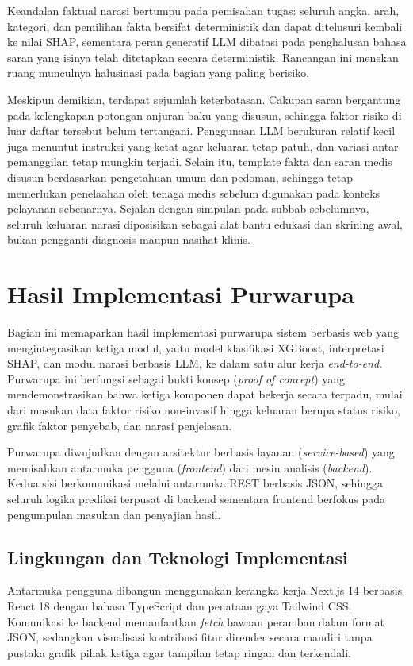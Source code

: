 Keandalan faktual narasi bertumpu pada pemisahan tugas: seluruh angka, arah, kategori, dan pemilihan fakta bersifat deterministik dan dapat ditelusuri kembali ke nilai SHAP, sementara peran generatif LLM dibatasi pada penghalusan bahasa saran yang isinya telah ditetapkan secara deterministik. Rancangan ini menekan ruang munculnya halusinasi pada bagian yang paling berisiko.

Meskipun demikian, terdapat sejumlah keterbatasan. Cakupan saran bergantung pada kelengkapan potongan anjuran baku yang disusun, sehingga faktor risiko di luar daftar tersebut belum tertangani. Penggunaan LLM berukuran relatif kecil juga menuntut instruksi yang ketat agar keluaran tetap patuh, dan variasi antar pemanggilan tetap mungkin terjadi. Selain itu, template fakta dan saran medis disusun berdasarkan pengetahuan umum dan pedoman, sehingga tetap memerlukan penelaahan oleh tenaga medis sebelum digunakan pada konteks pelayanan sebenarnya. Sejalan dengan simpulan pada subbab sebelumnya, seluruh keluaran narasi diposisikan sebagai alat bantu edukasi dan skrining awal, bukan pengganti diagnosis maupun nasihat klinis.

\section{Hasil Implementasi Purwarupa}
\label{sec:hasil-prototype}
Bagian ini memaparkan hasil implementasi purwarupa sistem berbasis web yang mengintegrasikan ketiga modul, yaitu model klasifikasi XGBoost, interpretasi SHAP, dan modul narasi berbasis LLM, ke dalam satu alur kerja \emph{end-to-end}. Purwarupa ini berfungsi sebagai bukti konsep (\emph{proof of concept}) yang mendemonstrasikan bahwa ketiga komponen dapat bekerja secara terpadu, mulai dari masukan data faktor risiko non-invasif hingga keluaran berupa status risiko, grafik faktor penyebab, dan narasi penjelasan.

Purwarupa diwujudkan dengan arsitektur berbasis layanan (\emph{service-based}) yang memisahkan antarmuka pengguna (\emph{frontend}) dari mesin analisis (\emph{backend}). Kedua sisi berkomunikasi melalui antarmuka REST berbasis JSON, sehingga seluruh logika prediksi terpusat di backend sementara frontend berfokus pada pengumpulan masukan dan penyajian hasil.

\subsection{Lingkungan dan Teknologi Implementasi}
Antarmuka pengguna dibangun menggunakan kerangka kerja Next.js 14 berbasis React 18 dengan bahasa TypeScript dan penataan gaya Tailwind CSS. Komunikasi ke backend memanfaatkan \textit{fetch} bawaan peramban dalam format JSON, sedangkan visualisasi kontribusi fitur dirender secara mandiri tanpa pustaka grafik pihak ketiga agar tampilan tetap ringan dan terkendali.

